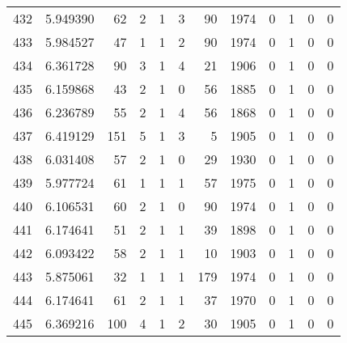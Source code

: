 \begin{tabular}{lrrrrrrrrrrr}
432 &  5.949390 &   62 &      2 &        1 &      3 &              90 &  1974 &               0 &               1 &               0 &               0 \\
433 &  5.984527 &   47 &      1 &        1 &      2 &              90 &  1974 &               0 &               1 &               0 &               0 \\
434 &  6.361728 &   90 &      3 &        1 &      4 &              21 &  1906 &               0 &               1 &               0 &               0 \\
435 &  6.159868 &   43 &      2 &        1 &      0 &              56 &  1885 &               0 &               1 &               0 &               0 \\
436 &  6.236789 &   55 &      2 &        1 &      4 &              56 &  1868 &               0 &               1 &               0 &               0 \\
437 &  6.419129 &  151 &      5 &        1 &      3 &               5 &  1905 &               0 &               1 &               0 &               0 \\
438 &  6.031408 &   57 &      2 &        1 &      0 &              29 &  1930 &               0 &               1 &               0 &               0 \\
439 &  5.977724 &   61 &      1 &        1 &      1 &              57 &  1975 &               0 &               1 &               0 &               0 \\
440 &  6.106531 &   60 &      2 &        1 &      0 &              90 &  1974 &               0 &               1 &               0 &               0 \\
441 &  6.174641 &   51 &      2 &        1 &      1 &              39 &  1898 &               0 &               1 &               0 &               0 \\
442 &  6.093422 &   58 &      2 &        1 &      1 &              10 &  1903 &               0 &               1 &               0 &               0 \\
443 &  5.875061 &   32 &      1 &        1 &      1 &             179 &  1974 &               0 &               1 &               0 &               0 \\
444 &  6.174641 &   61 &      2 &        1 &      1 &              37 &  1970 &               0 &               1 &               0 &               0 \\
445 &  6.369216 &  100 &      4 &        1 &      2 &              30 &  1905 &               0 &               1 &               0 &               0 \\

\end{tabular}
